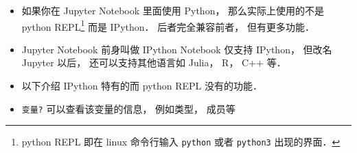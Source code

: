 
\begin{issues}
\issueDraft
\end{issues}

\begin{itemize}
\item 如果你在 Jupyter Notebook 里面使用 Python， 那么实际上使用的不是 python REPL\footnote{python REPL 即在 linux 命令行输入 \verb|python| 或者 \verb|python3| 出现的界面．} 而是 IPython． 后者完全兼容前者， 但有更多功能．
\item Jupyter Notebook 前身叫做 IPython Notebook 仅支持 IPython， 但改名 Jupyter 以后， 还可以支持其他语言如 Julia， R， C++ 等．
\item 以下介绍 IPython 特有的而 python REPL 没有的功能．
\item \verb|变量?| 可以查看该变量的信息， 例如类型， 成员等
\end{itemize}
